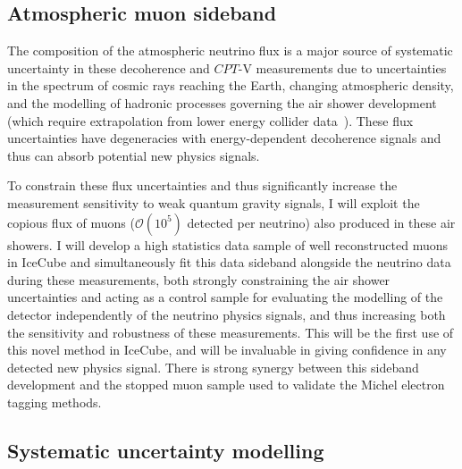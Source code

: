 \documentclass[a4paper,11pt]{article}
\begin{document}
\subsection{Atmospheric muon sideband}

The composition of the atmospheric neutrino flux is a major source of systematic uncertainty in these decoherence and $CPT$-V measurements due to uncertainties in the spectrum of cosmic rays reaching the Earth, changing atmospheric density, and the modelling of hadronic processes governing the air shower development (which require extrapolation from lower energy collider data~\cite{Barr:2006it}). These flux uncertainties have degeneracies with energy-dependent decoherence signals and thus can absorb potential new physics signals.

To constrain these flux uncertainties and thus significantly increase the measurement sensitivity to weak quantum gravity signals, I will exploit the copious flux of muons ($\mathcal{O}(10^5)$ detected per neutrino) also produced in these air showers. I will develop a high statistics data sample of well reconstructed muons in IceCube and simultaneously fit this data sideband alongside the neutrino data during these measurements, both strongly constraining the air shower uncertainties and acting as a control sample for evaluating the modelling of the detector independently of the neutrino physics signals, and thus increasing both the sensitivity and robustness of these measurements. This will be the first use of this novel method in IceCube, and will be invaluable in giving confidence in any detected new physics signal. There is strong synergy between this sideband development and the stopped muon sample used to validate the Michel electron tagging methods.  \\




\subsection{Systematic uncertainty modelling}
\end{document}
